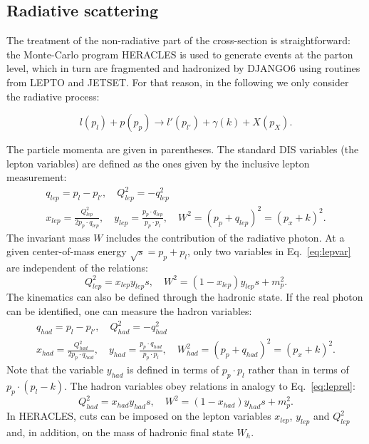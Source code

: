 \subsection{Radiative scattering}

The treatment of the non-radiative part of the cross-section is straightforward: the Monte-Carlo program HERACLES is used to generate events at the parton level, which in turn are fragmented and hadronized by DJANGO6 using routines from LEPTO and JETSET. For that reason, in the following we only consider the radiative process:

\begin{equation}
  l(p_l) + p(p_p) \rightarrow l'(p_{l'}) + \gamma(k) + X(p_X).
\end{equation}

The particle momenta are given in parentheses. The standard DIS variables (the lepton variables) are defined as the ones given by the inclusive lepton measurement:
%
\begin{equation}\label{eq:lepvar}
  \begin{split}
    q_{lep} = p_l - p_{l'},\quad Q_{lep}^2 = -q_{lep}^2 \\
    x_{lep} = \frac{Q^2_{lep}}{2p_p \cdot q_{lep}},\quad y_{lep} = \frac{p_p \cdot q_{lep}}{p_p \cdot p_l},\quad W^2 = (p_p+q_{lep})^2 = (p_x + k)^2.
  \end{split}
\end{equation}
%
The invariant mass $W$ includes the contribution of the radiative photon. At a given center-of-mass energy $\sqrt{s} = p_p+p_l$, only two variables in Eq.~\ref{eq:lepvar} are independent of the relations:
%
\begin{equation}\label{eq:leprel}
  Q^2_{lep} = x_{lep}y_{lep}s,\quad W^2 = (1-x_{lep})y_{lep}s + m^2_p.
\end{equation}
%
The kinematics can also be defined through the hadronic state. If the real photon can be identified, one can measure the hadron variables:
%
\begin{equation}
  \begin{split}
    q_{had} = p_l - p_{l'},\quad Q_{had}^2 = -q_{had}^2 \\
    x_{had} = \frac{Q^2_{had}}{2p_p \cdot q_{had}},\quad y_{had} = \frac{p_p \cdot q_{had}}{p_p \cdot p_l},\quad W_{had}^2 = (p_p+q_{had})^2 = (p_x + k)^2.
  \end{split}
\end{equation}
%
Note that the variable $y_{had}$ is defined in terms of $p_p \cdot p_l$ rather than in terms of $p_p \cdot (p_l-k)$. The hadron variables obey relations in analogy to Eq.~\ref{eq:leprel}:
%
\begin{equation}\label{eq:leprel}
  Q^2_{had} = x_{had}y_{had}s,\quad W^2 = (1-x_{had})y_{had}s + m^2_p.
\end{equation}
%
In HERACLES, cuts can be imposed on the lepton variables $x_{lep}$, $y_{lep}$ and $Q^2_{lep}$ and, in addition, on the mass of hadronic final state $W_h$.

